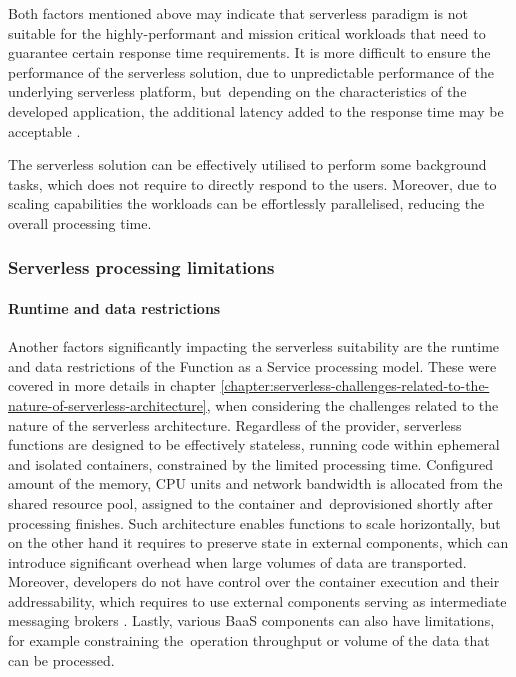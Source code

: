 Both factors mentioned above may indicate that serverless paradigm is not suitable for the highly-performant and mission critical workloads that need to guarantee certain response time requirements.
It is more difficult to ensure the performance of the serverless solution, due to unpredictable performance of the underlying serverless platform, but~depending on the characteristics of the developed application, the additional latency added to the response time may be acceptable \cite{LeveragingServerlessCloudComputingArchitectures}.

The serverless solution can be effectively utilised to perform some background tasks, which does not require to directly respond to the users. Moreover, due to scaling capabilities the workloads can be effortlessly parallelised, reducing the overall processing time.

\subsubsection{Serverless processing limitations}

\paragraph{Runtime and data restrictions} \label{chapter:serverless-processing-limitations-runtime-and-data-restrictions}

Another factors significantly impacting the serverless suitability are the runtime and data restrictions of the Function as a Service processing model. These were covered in more details in chapter \ref{chapter:serverless-challenges-related-to-the-nature-of-serverless-architecture}, when considering the challenges related to the nature of the serverless architecture.
Regardless of the provider, serverless functions are designed to be effectively stateless, running code within ephemeral and isolated containers, constrained by the limited processing time. Configured amount of the memory, CPU units and network bandwidth is allocated from the shared resource pool, assigned to the container and~deprovisioned shortly after processing finishes.
Such architecture enables functions to scale horizontally, but on the other hand it requires to preserve state in external components, which can introduce significant overhead when large volumes of data are transported.
Moreover, developers do not have control over the container execution and their addressability, which requires to use external components serving as intermediate messaging brokers \cite{MartinFowlerServerless}. Lastly, various BaaS components can also have limitations, for example constraining the~operation throughput or volume of the data that can be processed.

